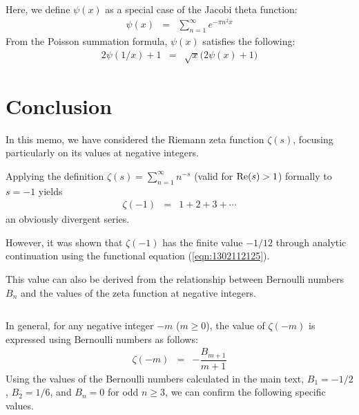 \documentclass[uplatex,a4j,12pt,dvipdfmx]{jsarticle}
\begin{document}
Here, we define $\psi(x)$ as a special case of the Jacobi theta function:
\begin{eqnarray}
	\psi(x)
	&=&
	\sum_{n=1}^{\infty}
	e^{- \pi n^{2} x}
\end{eqnarray}
From the Poisson summation formula,
$\psi(x)$ satisfies the following:
\begin{eqnarray}
	2 \psi ( 1/x )
	+
	1
	&=&
	\sqrt{x}
	\Big( 2 \psi(x) + 1 \Big)
\end{eqnarray}




\section{Conclusion}

In this memo, we have considered the Riemann zeta function $\zeta(s)$, focusing particularly on its values at negative integers.

Applying the definition $\zeta(s) = \sum_{n=1}^{\infty} n^{-s}$ (valid for ${\rm Re}(s) > 1$) formally to $s=-1$ yields
\begin{eqnarray}
	\zeta(-1)
	&=&
	1+2+3+\cdots
\end{eqnarray}
an obviously divergent series.

However, it was shown that $\zeta(-1)$ has the finite value $-1/12$ through analytic continuation using the functional equation (\ref{eqn:1302112125}).

This value can also be derived from the relationship between Bernoulli numbers $B_n$ and the values of the zeta function at negative integers.

${}$

In general, for any negative integer $-m$ ($m \ge 0$), the value of $\zeta(-m)$ is expressed using Bernoulli numbers as follows:
\begin{eqnarray}
	\zeta(-m)
	&=&
	-
	\dfrac{B_{m+1}}{m+1}
\end{eqnarray}
Using the values of the Bernoulli numbers calculated in the main text, $B_1 = -1/2$, $B_2 = 1/6$, and $B_n = 0$ for odd $n \ge 3$, we can confirm the following specific values.
\end{document}

